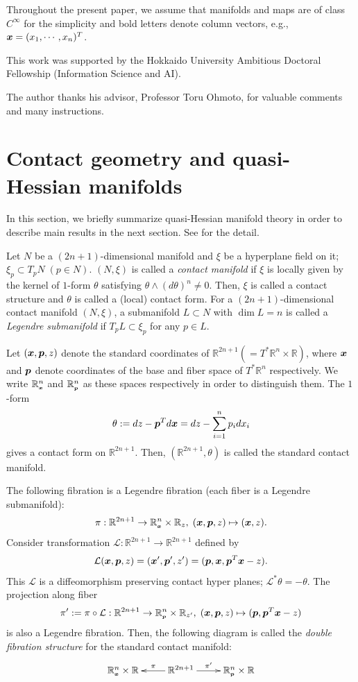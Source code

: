 \documentclass[10pt]{amsart}
\newcommand{\Lcal}{\mathcal{L}}
\newcommand{\R}{\mathbb{R}}
\def\bx{\mbox{\boldmath $x$}}
\def\bp{\mbox{\boldmath $p$}}
\def\bbx{\mbox{\tiny$\bx$}}
\def\bbp{\mbox{\tiny$\bp$}}
\begin{document}
Throughout the present paper, we assume that manifolds and maps are of class $C^\infty$ for the simplicity and bold letters denote column vectors, e.g., $\bx=(x_1,\cdots,x_n)^T$.

This work was supported by the Hokkaido University Ambitious Doctoral Fellowship (Information Science and AI).

The author thanks his advisor, Professor Toru Ohmoto, for valuable comments and many instructions.









\section{Contact geometry and quasi-Hessian manifolds}\label{sec:2}
In this section, we briefly summarize quasi-Hessian manifold theory in order to describe main results in the next section. 
See \cite{NT} for the detail.

Let $N$ be a $(2n+1)$-dimensional manifold and $\xi$ be a hyperplane field on it; $\xi_p \subset T_pN\;(p\in N)$. $(N, \xi)$ is called a {\em contact manifold} if $\xi$ is locally given by the kernel of $1$-form $\theta$ satisfying $\theta \wedge (d\theta)^n \neq 0$. 
Then, $\xi$ is called a contact structure and $\theta$ is called a (local) contact form. 
For a $(2n+1)$-dimensional contact manifold $(N, \xi)$, a submanifold $L\subset N$ with $\dim L=n$ is called a {\em Legendre submanifold} if $T_pL\subset \xi_p$ for any $p\in L$. 

Let $(\bx,\bp,z)$ denote the standard coordinates of $\R^{2n+1}(=T^*\R^n \times\R)$, where $\bx$ and $\bp$ denote coordinates of the base and fiber space of $T^*\R^n$ respectively. 
We write $\R^n_{\bbx}$ and $\R^n_{\bbp}$ as these spaces respectively in order to distinguish them.
The $1$-form
$$\theta:=dz-\bp^Td\bx = dz-\sum_{i=1}^np_idx_i$$
gives a contact form on $\R^{2n+1}$. Then, $(\R^{2n+1}, \theta)$ is called the standard contact manifold. 

The following fibration is a Legendre fibration (each fiber is a Legendre submanifold):
$$\pi:\R^{2n+1}\to\R^n_{\bbx}\times\R_z,\;(\bx,\bp,z)\mapsto(\bx,z).$$
Consider transformation $\Lcal: \R^{2n+1}\to\R^{2n+1}$ defined by
$$\Lcal(\bx,\bp,z)=(\bx',\bp',z')=(\bp,\bx,\bp^T\bx-z).$$
This $\Lcal$ is a diffeomorphism preserving contact hyper planes; $\Lcal^*\theta=-\theta$. 
The projection along fiber 
$$\pi' :=\pi\circ\Lcal:\R^{2n+1}\to\R^n_{\bbp}\times\R_{z'},\;(\bx,\bp,z)\mapsto(\bp,\bp^T\bx-z)$$
is also a Legendre fibration. Then, the following diagram is called the {\em double fibration structure} for the standard contact manifold:
\begin{align}\label{double fibration}
\xymatrix{\R^{n}_{\bbx}\times \R & \R^{2n+1} \ar[l]_-\pi \ar[r]^-{\pi'} & \R^{n}_{\bbp}\times \R}
\end{align}
\end{document}
